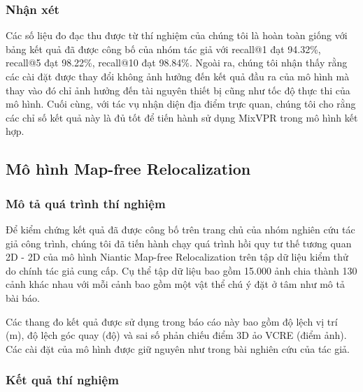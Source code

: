 \subsubsection*{Nhận xét}

Các số liệu đo đạc thu được từ thí nghiệm của chúng tôi là hoàn toàn giống với bảng kết quả đã được công bố của nhóm tác giả với recall@1 đạt 94.32\%, recall@5 đạt 98.22\%, recall@10 đạt 98.84\%. Ngoài ra, chúng tôi nhận thấy rằng các cài đặt được thay đổi không ảnh hưởng đến kết quả đầu ra của mô hình mà thay vào đó chỉ ảnh hưởng đến tài nguyên thiết bị cũng như tốc độ thực thi của mô hình. Cuối cùng, với tác vụ nhận diện địa điểm trực quan, chúng tôi cho rằng các chỉ số kết quả này là đủ tốt để tiến hành sử dụng MixVPR trong mô hình kết hợp.

\subsection{Mô hình Map-free Relocalization}
\subsubsection*{Mô tả quá trình thí nghiệm}

Để kiểm chứng kết quả đã được công bố trên trang chủ của nhóm nghiên cứu tác giả công trình, chúng tôi đã tiến hành chạy quá trình hồi quy tư thế tương quan 2D - 2D của mô hình Niantic Map-free Relocalization trên tập dữ liệu kiểm thử do chính tác giả cung cấp. Cụ thể tập dữ liệu bao gồm 15.000 ảnh chia thành 130 cảnh khác nhau với mỗi cảnh bao gồm một vật thể chú ý đặt ở tâm như mô tả bài báo.

Các thang đo kết quả được sử dụng trong báo cáo này bao gồm độ lệch vị trí (m), độ lệch góc quay (độ) và sai số phản chiếu điểm 3D ảo VCRE (điểm ảnh). Các cài đặt của mô hình được giữ nguyên như trong bài nghiên cứu của tác giả.

\subsubsection*{Kết quả thí nghiệm}

